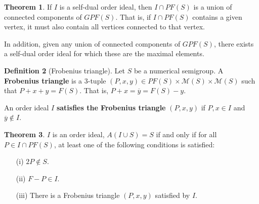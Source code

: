 \documentclass{article}
\theoremstyle{definition}
\newtheorem{thm}{Theorem}[section]
\theoremstyle{definition}
\newtheorem{defn}[thm]{Definition}
\theoremstyle{definition}
\begin{document}
\begin{thm}
    If $I$ is a self-dual order ideal, then $I \cap PF(S)$ is a union of connected components of $GPF(S)$. That is, if $I \cap PF(S)$ contains a given vertex, it must also contain all vertices connected to that vertex.

    In addition, given any union of connected components of $GPF(S)$, there exists a self-dual order ideal for which these are the maximal elements. 
\end{thm}

\begin{defn}[Frobenius triangle]
    Let $S$ be a numerical semigroup. A \textbf{Frobenius triangle} is a 3-tuple $(P, x,y)\in PF(S) \times \mathcal{M}(S) \times \mathcal{M}(S)$ such that $P+x+y =F(S)$. That is, $P+x = \overline{y}=F(S) -y$.

    An order ideal $I$ \textbf{satisfies the Frobenius triangle} $(P, x, y)$ if $P, x \in I$ and $\overline{y} \notin I$.
\end{defn}

\begin{thm}
    $I$ is an order ideal, $A(I\cup S) = S$ if and only if for all $P \in I \cap PF(S)$, at least one of the following conditions is satisfied:
    \begin{enumerate}
        \item[(i)] $2P \notin S$.
        \item[(ii)] $F-P \in I$.
        \item[(iii)] There is a Frobenius triangle $(P, x, y)$ satisfied by $I$.
        
    \end{enumerate}
\end{thm}
\end{document}
